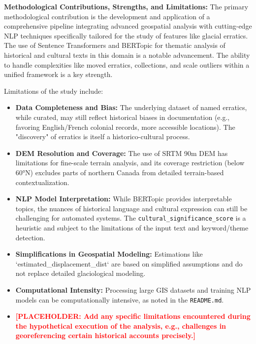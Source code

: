 \documentclass[
11pt, %
english, %
singlespacing, %
headsepline, %
]{MastersDoctoralThesis} %
\newcommand{\placeholdertext}[1]{\textcolor{red}{\textbf{[PLACEHOLDER: #1]}}}
\begin{document}
\textbf{Methodological Contributions, Strengths, and Limitations:}
The primary methodological contribution is the development and application of a comprehensive pipeline integrating advanced geospatial analysis with cutting-edge NLP techniques specifically tailored for the study of features like glacial erratics. The use of Sentence Transformers and BERTopic for thematic analysis of historical and cultural texts in this domain is a notable advancement. The ability to handle complexities like moved erratics, collections, and scale outliers within a unified framework is a key strength.

Limitations of the study include:
\begin{itemize}
    \item \textbf{Data Completeness and Bias:} The underlying dataset of named erratics, while curated, may still reflect historical biases in documentation (e.g., favoring English/French colonial records, more accessible locations). The "discovery" of erratics is itself a historico-cultural process.
    \item \textbf{DEM Resolution and Coverage:} The use of SRTM 90m DEM has limitations for fine-scale terrain analysis, and its coverage restriction (below 60°N) excludes parts of northern Canada from detailed terrain-based contextualization.
    \item \textbf{NLP Model Interpretation:} While BERTopic provides interpretable topics, the nuances of historical language and cultural expression can still be challenging for automated systems. The \texttt{cultural\_significance\_score} is a heuristic and subject to the limitations of the input text and keyword/theme detection.
    \item \textbf{Simplifications in Geospatial Modeling:} Estimations like \\`estimated\_displacement\_dist` are based on simplified assumptions and do not replace detailed glaciological modeling.
    \item \textbf{Computational Intensity:} Processing large GIS datasets and training NLP models can be computationally intensive, as noted in the \texttt{README.md}.
    \item \placeholdertext{Add any specific limitations encountered during the hypothetical execution of the analysis, e.g., challenges in georeferencing certain historical accounts precisely.}
\end{itemize}
\end{document}
